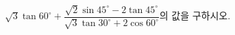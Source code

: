 $\sqrt{3}\tan 60^\circ+\dfrac{\sqrt{2}\sin 45^\circ-2\tan 45^\circ}{\sqrt{3}\tan 30^\circ+2\cos 60^\circ}$의 값을 구하시오.
